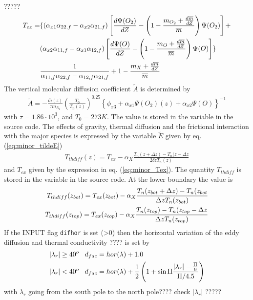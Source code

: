  ?????
%
\begin{align}
  T_{ex} =&  \{ (\alpha_{x1} \alpha_{22,f}-\alpha_{x2}\alpha_{21,f})\left[
     \frac{d \Psi(O_2)}{dZ}- \left(1 - \frac{m_{O_2}+\frac{d \overline{m}}{d Z}}
     {\overline{m}}\right)\Psi(O_2)\right] + \notag \\
     {} & (\alpha_{x2} \alpha_{11,f}-\alpha_{x1}\alpha_{12,f})\left[
     \frac{d \Psi(O)}{dZ}- \left(1 - \frac{m_{O}+\frac{d \overline{m}}{d Z}}
     {\overline{m}}\right)\Psi(O)\right] \} \notag \\
     {} & \frac{1}{\alpha_{11,f}\alpha_{22,f}
     - \alpha_{12,f}\alpha_{21,f}} + 1 - \frac{m_{X}+\frac{d \overline{m}}{d Z}}
     {\overline{m}} \label{eq:minor_Tex}
\end{align}
%
The vertical molecular diffusion coefficient $\tilde{A}$ is
determined by
%
\begin{align}
  \tilde{A} = - \frac{\overline{m}(z)}{\tau m_{N_2}}\left( \frac{T_0}{T_n(z)}
  \right)^{0.25}\left\{ \phi_{x3} + \alpha_{x1}\Psi(O_2)(z) +
  \alpha_{x2}\Psi(O)\right\}^{-1}
\end{align}
%
with $\tau = 1.86 \cdot 10^{3}$, and $T_0 = 273 K$. The value is
stored in the variable  in the source code. The effects of
gravity, thermal diffusion and the frictional interaction with the
major species is expressed by the variable $\tilde{E}$ given by eq.
(\ref{eq:minor_tildeE})
%
\begin{align}
  T_{thdiff}(z) = T_{ex} -\alpha_X \frac{T_n(z+\Delta z)- T_n(z-\Delta z}{2 \delta z T_n(z)}
\end{align}
%
and $T_{ex}$ given by the expression in eq. (\ref{eq:minor_Tex}).
The quantity $T_{thdiff}$ is stored in the variable  in
the source code. At the lower boundary the value is
%
\begin{align}
  T_{thdiff}(z_{bot}) = T_{ex}(z_{bot}) -\alpha_X \frac{T_n(z_{bot}+\Delta z)-
  T_n(z_{bot}}{ \Delta z T_n(z_{bot})} \notag \\
  T_{thdiff}(z_{top}) = T_{ex}(z_{top}) -\alpha_X \frac{T_n(z_{top})-
  T_n(z_{top}-\Delta z}{ \Delta z T_n(z_{top})}
\end{align}
%
If the INPUT flag \verb"difhor" is set (>0) then the horizontal
variation of the eddy diffusion and thermal conductivity ???? is set
by
%
\begin{align}
  |\lambda_r| \geq 40^o \;\;\; & d_{fac} = hor(\lambda)+ 1.0 \notag \\
  |\lambda_r| < 40^o \;\;\; & d_{fac} = hor(\lambda)+
  \frac{1}{2}\left( 1 + \sin{\Pi \frac{|\lambda_r| - \frac{\Pi}{9}}{\Pi/4.5}}\right)
\end{align}
%
with $\lambda_r$ going from the south pole to the north pole????
check $ |\lambda_r|$ ?????
\\

